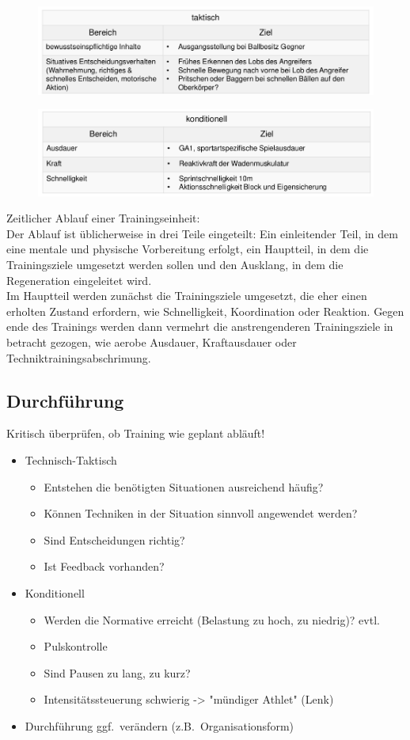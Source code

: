 \begin{figure}[H]
  \centering
  \includegraphics[width=.7\textwidth]{pictures/trainingssteuerung_zieldefinition_taktisch.png}
\end{figure}
\begin{figure}[H]
  \centering
  \includegraphics[width=.7\textwidth]{pictures/trainingssteuerung_zieldefinition_konditionell.png}
\end{figure}
Zeitlicher Ablauf einer Trainingseinheit:\\
Der Ablauf ist üblicherweise in drei Teile eingeteilt: Ein einleitender Teil, in dem eine mentale und physische Vorbereitung erfolgt, ein Hauptteil, in dem die Trainingsziele umgesetzt werden sollen und den Ausklang, in dem die Regeneration eingeleitet wird.\\
Im Hauptteil werden zunächst die Trainingsziele umgesetzt, die eher einen erholten Zustand erfordern, wie Schnelligkeit, Koordination oder Reaktion.
Gegen ende des Trainings werden dann vermehrt die anstrengenderen Trainingsziele in betracht gezogen, wie aerobe Ausdauer, Kraftausdauer oder Techniktrainingsabschrimung.

\subsection{Durchführung}
Kritisch überprüfen, ob Training wie geplant abläuft!
\begin{itemize}
  \item Technisch-Taktisch
    \begin{itemize}
      \item Entstehen die benötigten Situationen ausreichend häufig?
      \item Können Techniken in der Situation sinnvoll angewendet werden?
      \item Sind Entscheidungen richtig?
      \item Ist Feedback vorhanden?
    \end{itemize}
  \item Konditionell
    \begin{itemize}
      \item Werden die Normative erreicht (Belastung zu hoch, zu niedrig)? evtl.
      \item Pulskontrolle
      \item Sind Pausen zu lang, zu kurz?
      \item Intensitätssteuerung schwierig -> "mündiger Athlet" (Lenk)
    \end{itemize}
  \item Durchführung ggf.\ verändern (z.B.\ Organisationsform)
\end{itemize}

